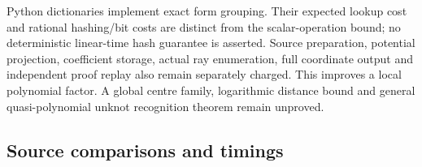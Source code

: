 Python dictionaries implement exact form grouping. Their expected lookup
cost and rational hashing/bit costs are distinct from the scalar-operation
bound; no deterministic linear-time hash guarantee is asserted.
Source preparation, potential projection, coefficient storage, actual
ray enumeration, full coordinate output and independent proof replay also
remain separately charged. This improves a local polynomial factor. A
global centre family, logarithmic distance bound and general quasi-polynomial
unknot recognition theorem remain unproved.

\subsection{Source comparisons and timings}

